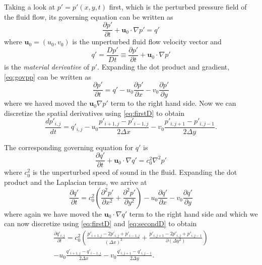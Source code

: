 \documentclass[11pt]{article}
\begin{document}
Taking a look at $p' = p'(x,y,t)$ first, which is the perturbed pressure field of the fluid flow, its governing equation can be written as
\begin{equation} \label{eq:govpp}
  \frac{\partial p'}{\partial t} + \mathbf{u}_0 \cdot \nabla p' = q'
\end{equation}
where $\mathbf{u}_0 = (u_0, v_0)$ is the unperturbed fluid flow velocity vector and
\begin{equation*}
  q' = \frac{Dp'}{Dt} \equiv \frac{\partial p'}{\partial t} + \mathbf{u}_0 \cdot \nabla p'
\end{equation*}
is the \emph{material derivative} of $p'$. Expanding the dot product and gradient, \eqref{eq:govpp} can be written as
\begin{equation} \label{eq:govpp}
\frac{\partial p'}{\partial t} = q' - u_0 \frac{\partial p'}{\partial x} - v_0 \frac{\partial p'}{\partial y}
\end{equation}
where we haved moved the $\mathbf{u}_0 \nabla p'$ term to the right hand side. Now we can discretize the spatial derivatives using \eqref{eq:firstD} to obtain
\begin{equation} \label{eq:ppDisc}
  \frac{dp'_{i,j}}{dt} = q'_{i,j} - u_0\frac{p'_{i+1,j} - p'_{i-1,j}}{2\Delta x} - v_0 \frac{p'_{i,j+1} - p'_{i,j-1}}{2\Delta y}.
\end{equation}

The corresponding governing equation for $q'$ is
\begin{equation}
  \frac{\partial q'}{\partial t} + \mathbf{u}_0 \cdot \nabla q' = c_0^2 \nabla^2 p'
\end{equation}
where $c_0^2$ is the unperturbed speed of sound in the fluid. Expanding the dot product and the Laplacian terms, we arrive at
\begin{equation}
  \frac{\partial q'}{\partial t} = c_0^2 \left( \frac{\partial^2 p'}{\partial x^2} + \frac{\partial^2 p'}{\partial y^2}\right) - u_0 \frac{\partial q'}{\partial x} - v_0 \frac{\partial q'}{\partial y}
\end{equation}
where again we have moved the $\mathbf{u}_0 \cdot \nabla q'$ term to the right hand side and which we can now discretize using \eqref{eq:firstD} and \eqref{eq:secondD} to obtain
\begin{multline} \label{eq:qpDisc}
  \frac{\partial q'_{i,j}}{\partial t} = c_0^2 \left( \frac{p'_{i+1,j} - 2p'_{i,j} + p'_{i-1,j}}{(\Delta x)^2} + \frac{p'_{i,j+1} - 2p'_{i,j} + p'_{i,j-1}}{\partial (\Delta y^2)} \right) \\
  - u_0\frac{q'_{i+1,j} - q'_{i-1,j}}{2\Delta x} - v_0 \frac{q'_{i,j+1} - q'_{i,j-1}}{2\Delta y}.
\end{multline}
\end{document}
